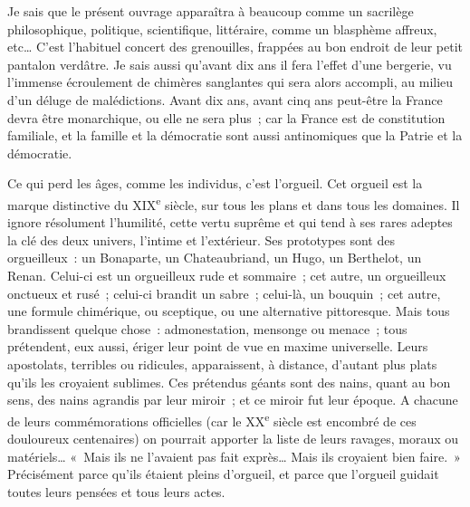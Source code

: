 \documentclass[french,twoside]{book} %
\begin{document}
Je sais que le présent ouvrage apparaîtra à beaucoup comme un sacrilège philosophique, politique, scientifique, littéraire, comme un blasphème affreux, etc… C’est l’habituel concert des grenouilles, frappées au bon endroit de leur petit pantalon verdâtre. Je sais aussi qu’avant dix ans il fera l’effet d’une bergerie, vu l’immense écroulement de chimères sanglantes qui sera alors accompli, au milieu d’un déluge de malédictions. Avant dix ans, avant cinq ans peut-être la France devra être monarchique, ou elle ne sera plus ; car la France est de constitution familiale, et la famille et la démocratie sont aussi antinomiques que la Patrie et la démocratie.\par
Ce qui perd les âges, comme les individus, c’est l’orgueil. Cet orgueil est la marque distinctive du XIX\textsuperscript{e} siècle, sur tous les plans et dans tous les domaines. Il ignore résolument l’humilité, cette vertu suprême et qui tend à ses rares adeptes la clé des deux univers, l’intime et l’extérieur. Ses prototypes sont des orgueilleux : un Bonaparte, un Chateaubriand, un Hugo, un Berthelot, un Renan. Celui-ci est un orgueilleux rude et sommaire ; cet autre, un orgueilleux onctueux et rusé ; celui-ci brandit un sabre ; celui-là, un bouquin ; cet autre, une formule chimérique, ou sceptique, ou une alternative pittoresque. Mais tous brandissent quelque chose : admonestation, mensonge ou menace ; tous prétendent, eux aussi, ériger leur point de vue en maxime universelle. Leurs apostolats, terribles ou ridicules, apparaissent, à distance, d’autant plus plats qu’ils les croyaient sublimes. Ces prétendus géants sont des nains, quant au bon sens, des nains agrandis par leur miroir ; et ce miroir fut leur époque. A chacune de leurs commémorations officielles (car le XX\textsuperscript{e} siècle est encombré de ces douloureux centenaires) on pourrait apporter la liste de leurs ravages, moraux ou matériels… « Mais ils ne l’avaient pas fait exprès… Mais ils croyaient bien faire. » Précisément parce qu’ils étaient pleins d’orgueil, et parce que l’orgueil guidait toutes leurs pensées et tous leurs actes.\par
\end{document}
